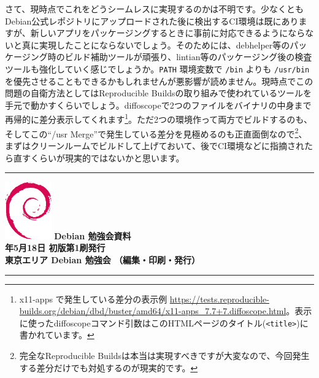 \documentclass[mingoth,a4paper]{jsarticle}
\newcommand{\debmtgyear}{2019}
\newcommand{\debmtgmonth}{5}
\newcommand{\debmtgdate}{18}
\begin{document}
さて、現時点でこれをどうシームレスに実現するのかは不明です。少なくともDebian公式レポジトリにアップロードされた後に検出するCI環境は既にありますが、新しいアプリをパッケージングするときに事前に対応できるようにならないと真に実現したことにならないでしょう。そのためには、debhelper等のパッケージング時のビルド補助ツールが頑張り、lintian等のパッケージング後の検査ツールも強化していく感じでしょうか。\verb|PATH| 環境変数で \verb|/bin| よりも \verb|/usr/bin| を優先させることもできるかもしれませんが悪影響が読めません。現時点でこの問題の自衛方法としてはReproducible Buildsの取り組みで使われているツールを手元で動かすくらいでしょう。diffoscopeで2つのファイルをバイナリの中身まで再帰的に差分表示してくれます\footnote{x11-apps で発生している差分の表示例 \url{https://tests.reproducible-builds.org/debian/dbd/buster/amd64/x11-apps_7.7+7.diffoscope.html}。表示に使ったdiffoscopeコマンド引数はこのHTMLページのタイトル(\texttt{<title>})に書かれています。}。ただ2つの環境作って両方でビルドするのも、そしてこの``/usr Merge''で発生している差分を見極めるのも正直面倒なので\footnote{完全なReproducible Buildsは本当は実現すべきですが大変なので、今回発生する差分だけでも対処するのが現実的です。}、まずはクリーンルームでビルドして上げておいて、後でCI環境などに指摘されたら直すくらいが現実的ではないかと思います。

%
\mbox{}\newpage
\mbox{}\newpage
\mbox{}\newpage

\vspace*{15cm}
\hrule
\vspace{2mm}
\includegraphics[width=2cm]{image200502/openlogo-nd.eps}
\noindent \Large \bf Debian 勉強会資料\\
\noindent \normalfont \debmtgyear{}年\debmtgmonth{}月\debmtgdate{}日 \hspace{5mm}  初版第1刷発行\\
\noindent \normalfont 東京エリア Debian 勉強会 （編集・印刷・発行）\\
\hrule
\end{document}
